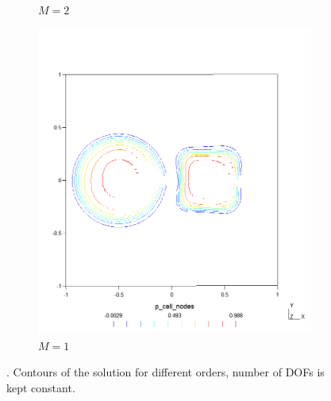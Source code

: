 \begin{figure}[p!]
\begin{subfigure}{.5\textwidth}
        \caption{$M=2$}
    \end{subfigure}%
    \begin{subfigure}{.5\textwidth}
        \centering
        \includegraphics[width=\linewidth]{../figs/sols/kriv-sol-h14400o01}
        \caption{$M = 1$}
    \end{subfigure}
    \caption{. Contours of the solution for different orders, number
    of DOFs is kept constant.}
    \label{fig:sol_cont_adv2D}
\end{figure}

